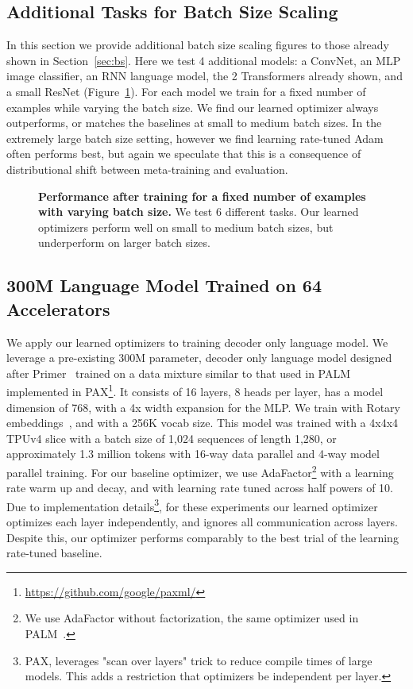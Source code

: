 \documentclass[11pt]{article}
\begin{document}
\subsection{Additional Tasks for Batch Size Scaling} \label{app:experiment_more_bs}
In this section we provide additional batch size scaling figures to those already shown in Section~\ref{sec:bs}.
Here we test 4 additional models: a ConvNet, an MLP image classifier, an RNN language model, the 2 Transformers already shown, and a small ResNet (Figure~\ref{fig:full_bs_scaling}).
For each model we train for a fixed number of examples while varying the batch size.
We find our learned optimizer always outperforms, or matches the baselines at small to medium batch sizes. In the extremely large batch size setting, however we find learning rate-tuned Adam often performs best, but again we speculate that this is a consequence of distributional shift between meta-training and evaluation.

\begin{figure}[t!]
    \centering
    \caption{\textbf{Performance after training for a fixed number of examples with varying batch size.} We test 6 different tasks. Our learned optimizers perform well on small to medium batch sizes, but underperform on larger batch sizes.
    \label{fig:full_bs_scaling}
    }
\end{figure}

\subsection{300M Language Model Trained on 64 Accelerators}
We apply our learned optimizers to training decoder only language model.
We leverage a pre-existing 300M parameter, decoder only language model designed after Primer~\citep{so2021searching} trained on a data mixture similar to that used in PALM~\citep{chowdhery2022palm} implemented in PAX\footnote{\url{https://github.com/google/paxml/}}.
It consists of 16 layers, 8 heads per layer, has a model dimension of 768, with a 4x width expansion for the MLP. We train with Rotary embeddings~\citep{su2021roformer}, and with a 256K vocab size.
This model was trained with a 4x4x4 TPUv4 slice with a batch size of 1,024 sequences of length 1,280, or approximately 1.3 million tokens with 16-way data parallel and 4-way model parallel training.
For our baseline optimizer, we use AdaFactor\footnote{We use AdaFactor without factorization, the same optimizer used in PALM~\citep{chowdhery2022palm}.} with a learning rate warm up and decay, and with learning rate tuned across half powers of 10.
Due to implementation details\footnote{PAX, leverages "scan over layers" trick to reduce compile times of large models. This adds a restriction that optimizers be independent per layer.}, for these experiments our learned optimizer optimizes each layer independently, and ignores all communication across layers.
Despite this, our optimizer performs comparably to the best trial of the learning rate-tuned baseline. 
\end{document}
